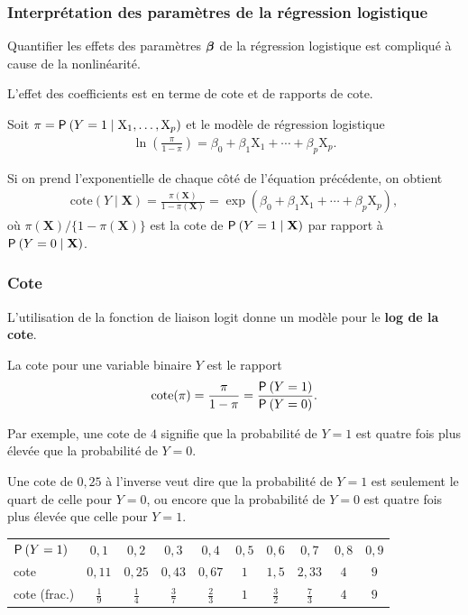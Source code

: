 \documentclass{beamer}
\begin{document}
\begin{frame}[fragile]
\frametitle{Interprétation des paramètres de la régression logistique}
\bi
\item Quantifier les effets des paramètres $\bs{\beta}$ de la régression logistique est compliqué à cause de la nonlinéarité.
\item L'effet des coefficients est en terme de \alert{cote} et de  \alert{rapports de cote}.
\item Soit $\pi=\P{Y=1\mid \mathrm{X}_1, \ldots, \mathrm{X}_p}$ et le modèle de régression logistique
\begin{align*}
\ln\left(\frac{\pi}{1-\pi}\right)=\beta_0+ \beta_1 \mathrm{X}_1 + \cdots + \beta_p\mathrm{X}_p.
\end{align*}
\item Si on prend l'exponentielle de chaque côté de l'équation précédente, on obtient
\begin{align*}
\mathrm{cote}(Y\mid \mathbf{X}) = \frac{\pi(\mathbf{X})}{1-\pi(\mathbf{X})}=\exp(\beta_0+ \beta_1 \mathrm{X}_1 + \cdots + \beta_p\mathrm{X}_p),
\end{align*}
où $\pi(\mathbf{X})/\{1-\pi(\mathbf{X})\}$ est la cote de $\P{Y=1 \mid \mathbf{X}}$ par rapport à $\P{Y=0 \mid\mathbf{X}}$.
\ei
\end{frame}
\begin{frame}[fragile]
\frametitle{Cote}
\bi
\item L'utilisation de la fonction de liaison logit donne un modèle pour le \textbf{log de la cote}.

\item La cote pour une variable binaire $Y$ est le rapport
\begin{align*}
 \mathrm{cote}(\pi) = \frac{\pi}{1-\pi} = \frac{\P{Y=1}}{\P{Y=0}}.
\end{align*}

\item Par exemple, une cote de $4$ signifie que la probabilité de  $Y=1$ est quatre fois plus élevée que la probabilité de $Y=0$. 
\item Une cote de $0,25$ à l'inverse veut dire que la probabilité de $Y=1$ est seulement le quart de celle pour $Y=0$, ou encore que la probabilité de $Y=0$ est quatre fois plus élevée que celle pour $Y=1$.
\ei

\begin{tabular}{lccccccccc}
\toprule
 $\P{Y=1}$& $0,1$ & $0,2$ & $0,3$ & $0,4$ & $0,5$ & $0,6$& $0,7$ & $ 0,8$& $0,9$\\
 cote & $0,11$ & $0,25$ & $0,43$ & $0,67$ & $1$ &$1,5$ & $2,33$ & $4$ & $9$\\
 cote (frac.) & $\frac{1}{9}$ & $\frac{1}{4}$
 & $\frac{3}{7}$ & $\frac{2}{3}$ & $1$ & $\frac{3}{2}$ & $\frac{7}{3}$ & $4$ & $9$\\
 \bottomrule
 
\end{tabular}
\end{frame}
\end{document}
